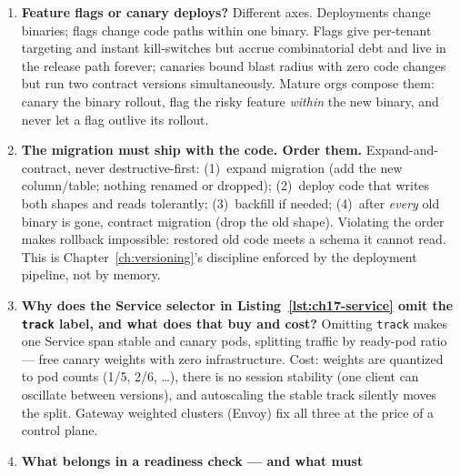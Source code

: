 \begin{enumerate}[label=\textbf{Q\arabic*.}, leftmargin=1.6cm, start=21]
        By \emph{requests}, not percentages: the gate needs enough canary
        volume to detect the regression you care about. At baseline
        $p_0$ and intolerance $\delta$, expected requests-to-decide scale
        roughly with $1/\delta^2$; at $p_0{=}0.4\%$ and
        $\delta{=}1$~pt that is a few hundred requests per step
        (Listing~\ref{lst:ch17-canary} resolves in 600), while a 1\%
        slice of a low-traffic API might take hours --- so either accept
        coarser $\delta$, lengthen windows, or synthesize load. Step
        count trades blast radius against total rollout time.
  \item \textbf{Feature flags or canary deploys?}
        Different axes. Deployments change binaries; flags change code
        paths within one binary. Flags give per-tenant targeting and
        instant kill-switches but accrue combinatorial debt and live in
        the release path forever; canaries bound blast radius with zero
        code changes but run two contract versions simultaneously.
        Mature orgs compose them: canary the binary rollout, flag the
        risky feature \emph{within} the new binary, and never let a flag
        outlive its rollout.
  \item \textbf{The migration must ship with the code. Order them.}
        Expand-and-contract, never destructive-first: (1)~expand
        migration (add the new column/table; nothing renamed or dropped);
        (2)~deploy code that writes both shapes and reads tolerantly;
        (3)~backfill if needed; (4)~after \emph{every} old binary is
        gone, contract migration (drop the old shape). Violating the
        order makes rollback impossible: restored old code meets a schema
        it cannot read. This is Chapter~\ref{ch:versioning}'s discipline
        enforced by the deployment pipeline, not by memory.
  \item \textbf{Why does the Service selector in
        Listing~\ref{lst:ch17-service} omit the \texttt{track} label, and
        what does that buy and cost?}
        Omitting \texttt{track} makes one Service span stable and canary
        pods, splitting traffic by ready-pod ratio --- free canary
        weights with zero infrastructure. Cost: weights are quantized to
        pod counts (1/5, 2/6, \ldots), there is no session stability
        (one client can oscillate between versions), and autoscaling the
        stable track silently moves the split. Gateway weighted clusters
        (Envoy) fix all three at the price of a control plane.
  \item \textbf{What belongs in a readiness check --- and what must
}
\end{enumerate}

